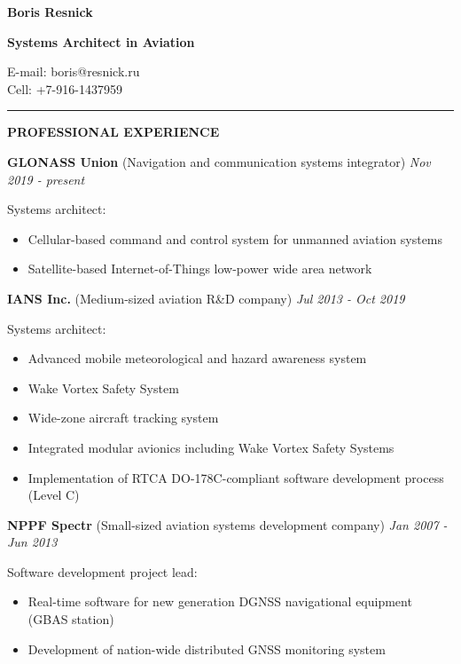 \documentclass[a4paper]{article}
\begin{document}
    \thispagestyle{empty}
    
	\begin{center}
		{\Large \textbf{Boris Resnick}\par}
		{\large \textbf{Systems Architect in Aviation}\par}
		E-mail: boris@resnick.ru\\
		Cell: +7-916-1437959
	\end{center}
	\vspace{-2mm}
	\rule{\textwidth}{1pt}
	\vspace{2mm}

	\textbf{PROFESSIONAL EXPERIENCE}
	\vspace{4mm}

	\textbf{GLONASS Union} (Navigation and communication systems integrator) \hfill \textit{Nov 2019 - present}
	
    Systems architect:
	\begin{itemize}
	    \item Cellular-based command and control system for unmanned aviation systems
        \item Satellite-based Internet-of-Things low-power wide area network
    \end{itemize}
    \vspace{3mm}
    
    \textbf{IANS Inc.} (Medium-sized aviation R\&D company) \hfill \textit{ Jul 2013 - Oct 2019}
    
    Systems architect:
	\begin{itemize}
	    \item Advanced mobile meteorological and hazard awareness system
	    \item Wake Vortex Safety System
	    \item Wide-zone aircraft tracking system
	    \item Integrated modular avionics including Wake Vortex Safety Systems
	    \item Implementation of RTCA DO-178C-compliant software development process (Level C)
    \end{itemize}
    \vspace{3mm}
    
    \textbf{NPPF Spectr} (Small-sized aviation systems development company) \hfill \textit{Jan 2007 - Jun 2013}
    
    Software development project lead:
	\begin{itemize}
	    \item Real-time software for new generation DGNSS navigational equipment (GBAS station)
	    \item Development of nation-wide distributed GNSS monitoring system
    \end{itemize}
    \vspace{3mm}
    
\end{document}
